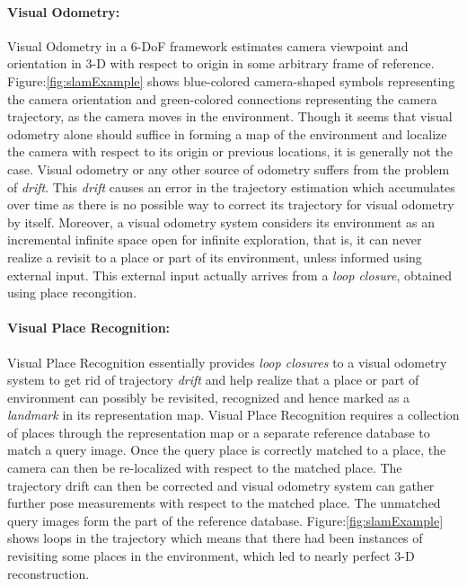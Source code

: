 \documentclass{article}
\begin{document}
\paragraph{Visual Odometry:}
Visual Odometry in a 6-DoF framework estimates camera viewpoint and orientation in 3-D with respect to origin in some arbitrary frame of reference. Figure:\ref{fig:slamExample} shows blue-colored camera-shaped symbols representing the camera orientation and green-colored connections representing the camera trajectory, as the camera moves in the environment. Though it seems that visual odometry alone should suffice in forming a map of the environment and localize the camera with respect to its origin or previous locations, it is generally not the case. Visual odometry or any other source of odometry suffers from the problem of \emph{drift}. This \emph{drift} causes an error in the trajectory estimation which accumulates over time as there is no possible way to correct its trajectory for visual odometry by itself. Moreover, a visual odometry system considers its environment as an incremental infinite space open for infinite exploration, that is, it can never realize a revisit to a place or part of its environment, unless informed using external input. This external input actually arrives from a \emph{loop closure}, obtained using place recongition.

\paragraph{Visual Place Recognition:}
Visual Place Recognition essentially provides \emph{loop closures} to a visual odometry system to get rid of trajectory \emph{drift} and help realize that a place or part of environment can possibly be revisited, recognized and hence marked as a \emph{landmark} in its representation map. Visual Place Recognition requires a collection of places through the representation map or a separate reference database to match a query image. Once the query place is correctly matched to a place, the camera can then be re-localized with respect to the matched place. The trajectory drift can then be corrected and visual odometry system can gather further pose measurements with respect to the matched place. The unmatched query images form the part of the reference database. Figure:\ref{fig:slamExample} shows loops in the trajectory which means that there had been instances of revisiting some places in the environment, which led to nearly perfect 3-D reconstruction.
\end{document}
